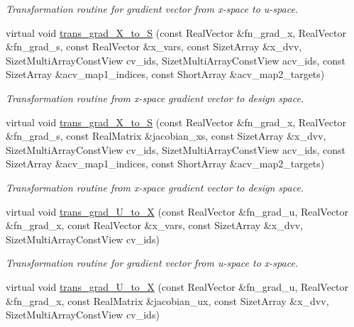 \begin{DoxyCompactItemize}
\begin{DoxyCompactList}\small\item\em Transformation routine for gradient vector from x-\/space to u-\/space. \end{DoxyCompactList}\item 
virtual void \hyperlink{classPecos_1_1ProbabilityTransformation_ade156a969120a98a9a7c7cab9a96b95a}{trans\+\_\+grad\+\_\+\+X\+\_\+to\+\_\+S} (const Real\+Vector \&fn\+\_\+grad\+\_\+x, Real\+Vector \&fn\+\_\+grad\+\_\+s, const Real\+Vector \&x\+\_\+vars, const Sizet\+Array \&x\+\_\+dvv, Sizet\+Multi\+Array\+Const\+View cv\+\_\+ids, Sizet\+Multi\+Array\+Const\+View acv\+\_\+ids, const Sizet\+Array \&acv\+\_\+map1\+\_\+indices, const Short\+Array \&acv\+\_\+map2\+\_\+targets)\label{classPecos_1_1ProbabilityTransformation_ade156a969120a98a9a7c7cab9a96b95a}

\begin{DoxyCompactList}\small\item\em Transformation routine from x-\/space gradient vector to design space. \end{DoxyCompactList}\item 
virtual void \hyperlink{classPecos_1_1ProbabilityTransformation_a3c3f2d04567b733c649d76da95053349}{trans\+\_\+grad\+\_\+\+X\+\_\+to\+\_\+S} (const Real\+Vector \&fn\+\_\+grad\+\_\+x, Real\+Vector \&fn\+\_\+grad\+\_\+s, const Real\+Matrix \&jacobian\+\_\+xs, const Sizet\+Array \&x\+\_\+dvv, Sizet\+Multi\+Array\+Const\+View cv\+\_\+ids, Sizet\+Multi\+Array\+Const\+View acv\+\_\+ids, const Sizet\+Array \&acv\+\_\+map1\+\_\+indices, const Short\+Array \&acv\+\_\+map2\+\_\+targets)\label{classPecos_1_1ProbabilityTransformation_a3c3f2d04567b733c649d76da95053349}

\begin{DoxyCompactList}\small\item\em Transformation routine from x-\/space gradient vector to design space. \end{DoxyCompactList}\item 
virtual void \hyperlink{classPecos_1_1ProbabilityTransformation_a1c9148d72997a3013aebbb513a998a96}{trans\+\_\+grad\+\_\+\+U\+\_\+to\+\_\+X} (const Real\+Vector \&fn\+\_\+grad\+\_\+u, Real\+Vector \&fn\+\_\+grad\+\_\+x, const Real\+Vector \&x\+\_\+vars, const Sizet\+Array \&x\+\_\+dvv, Sizet\+Multi\+Array\+Const\+View cv\+\_\+ids)\label{classPecos_1_1ProbabilityTransformation_a1c9148d72997a3013aebbb513a998a96}

\begin{DoxyCompactList}\small\item\em Transformation routine for gradient vector from u-\/space to x-\/space. \end{DoxyCompactList}\item 
virtual void \hyperlink{classPecos_1_1ProbabilityTransformation_aab090e0e7dac78688cfbde1fe2c80ca1}{trans\+\_\+grad\+\_\+\+U\+\_\+to\+\_\+X} (const Real\+Vector \&fn\+\_\+grad\+\_\+u, Real\+Vector \&fn\+\_\+grad\+\_\+x, const Real\+Matrix \&jacobian\+\_\+ux, const Sizet\+Array \&x\+\_\+dvv, Sizet\+Multi\+Array\+Const\+View cv\+\_\+ids)\label{classPecos_1_1ProbabilityTransformation_aab090e0e7dac78688cfbde1fe2c80ca1}


\end{DoxyCompactItemize}
